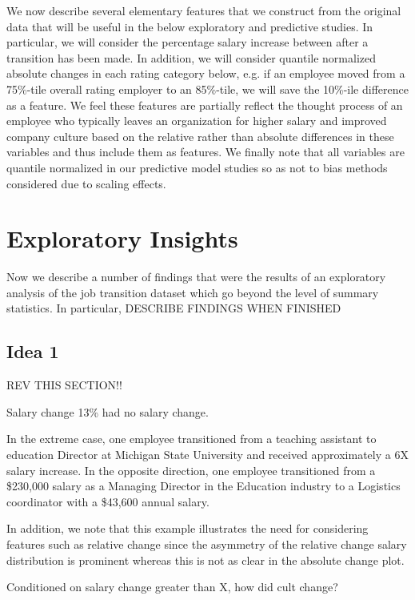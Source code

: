 \documentclass[10pt]{article}
\begin{document}
We now describe several elementary features that we construct from the original data that 
will be useful in the below exploratory and predictive studies.  In particular, we will 
consider the percentage salary increase between after a transition has been made. 
In addition, we will consider quantile normalized absolute changes in each rating 
category below, e.g. if an employee moved from a 75\%-tile overall rating employer 
to an 85\%-tile, we will save the 10\%-ile difference as a feature.  We feel these 
features are partially reflect the thought process of an employee who typically leaves an organization 
for higher salary and improved company culture based on the relative rather than absolute 
differences in these variables and thus include them as features.  We finally note that 
all variables are quantile normalized in our predictive model studies so as not to bias 
methods considered due to scaling effects.

\section{Exploratory Insights}

Now we describe a number of findings that were the results of an exploratory analysis of 
the job transition dataset which go beyond the level of summary statistics.  In particular, 
DESCRIBE FINDINGS WHEN FINISHED

\subsection{Idea 1}

REV THIS SECTION!!

Salary change 13\% had no salary change. 

In the extreme case, one employee transitioned from a teaching assistant to 
education Director at Michigan State University and received approximately a 6X 
salary increase.  In the opposite direction, one employee transitioned from a \$230,000 
salary as a Managing Director in the Education industry to a Logistics coordinator 
with a \$43,600 annual salary. 

In addition, we note that this example illustrates the need for considering 
features such as relative change since the asymmetry of the relative change salary distribution is 
prominent whereas this is not as clear in the absolute change plot.  

Conditioned on salary change greater than X, how did cult change? 
\end{document}
